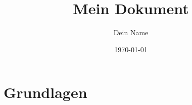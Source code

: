 \documentclass{book}
\begin{document}
\title{Mein Dokument}
\author{Dein Name}
\date{\today}
\maketitle

\chapter{Grundlagen}












































\end{document}
